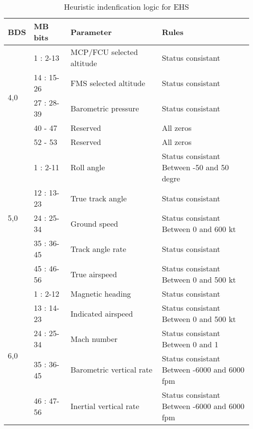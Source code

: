\begin{table}
\footnotesize
\centering
\small
\caption{Heuristic indenfication logic for EHS}
\label{tb:bds_rule_ehs}
\begin{tabular}{|l|l|l|l|}
\hline
\textbf{BDS} & \textbf{MB bits} & \textbf{Parameter} & \textbf{Rules} \\ \hline \hline
\multirow{5}{*}{4,0} & 1 : 2-13 & MCP/FCU selected altitude & Status consistant \\ \cline{2-4} 
& 14 : 15-26 & FMS selected altitude & Status consistant \\ \cline{2-4} 
& 27 : 28-39 & Barometric pressure & Status consistant \\ \cline{2-4} 
& 40 - 47 & Reserved & All zeros \\ \cline{2-4} 
& 52 - 53 & Reserved & All zeros \\ \hline \hline
\multirow{5}{*}{5,0} & 1 : 2-11 & Roll angle & \makecell*{Status consistant \\ Between -50 and 50 degre} \\ \cline{2-4} 
& 12 : 13-23 & True track angle & Status consistant \\ \cline{2-4} 
& 24 : 25-34 & Ground speed & \makecell*{Status consistant \\ Between 0 and 600 kt} \\ \cline{2-4} 
& 35 : 36-45 & Track angle rate & Status consistant \\ \cline{2-4} 
& 45 : 46-56 & True airspeed & \makecell*{Status consistant \\ Between 0 and 500 kt} \\ \hline \hline
\multirow{5}{*}{6,0} & 1 : 2-12 & Magnetic heading & Status consistant \\ \cline{2-4} 
& 13 : 14-23 & Indicated airspeed & \makecell*{Status consistant \\ Between 0 and 500 kt} \\ \cline{2-4} 
& 24 : 25-34 & Mach number & \makecell*{Status consistant \\ Between 0 and 1}\\ \cline{2-4} 
& 35 : 36-45 & Barometric vertical rate & \makecell*{Status consistant \\ Between -6000 and 6000 fpm} \\ \cline{2-4} 
& 46 : 47-56 & Inertial vertical rate & \makecell*{Status consistant \\ Between -6000 and 6000 fpm} \\ \hline
\end{tabular}
\end{table}


